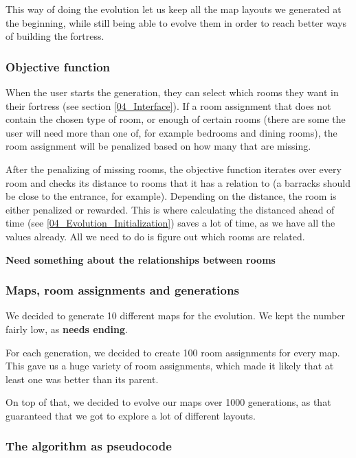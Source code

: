 This way of doing the evolution let us keep all the map layouts we generated at the beginning, while still being able to evolve them in order to reach better ways of building the fortress.

\subsubsection{Objective function}

When the user starts the generation, they can select which rooms they want in their fortress (see section \ref{04_Interface}). If a room assignment that does not contain the chosen type of room, or enough of certain rooms (there are some the user will need more than one of, for example bedrooms and dining rooms), the room assignment will be penalized based on how many that are missing.

After the penalizing of missing rooms, the objective function iterates over every room and checks its distance to rooms that it has a relation to (a barracks should be close to the entrance, for example). Depending on the distance, the room is either penalized or rewarded. This is where calculating the distanced ahead of time (see \ref{04_Evolution_Initialization}) saves a lot of time, as we have all the values already. All we need to do is figure out which rooms are related.

\textbf{Need something about the relationships between rooms}

\subsubsection{Maps, room assignments and generations}

We decided to generate 10 different maps for the evolution. We kept the number fairly low, as \textbf{needs ending}.

For each generation, we decided to create 100 room assignments for every map. This gave us a huge variety of room assignments, which made it likely that at least one was better than its parent.

On top of that, we decided to evolve our maps over 1000 generations, as that guaranteed that we got to explore a lot of different layouts. 

\subsubsection{The algorithm as pseudocode}

